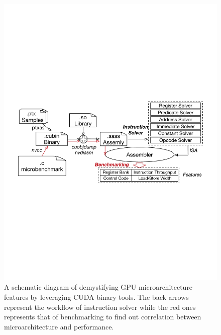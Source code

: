\documentclass{sig-alternate-05-2015}
\begin{document}
\begin{figure}[htbp]
\begin{center}
\includegraphics[scale=0.45]{methodology}
\caption{A schematic diagram of demystifying GPU microarchitecture features by leveraging CUDA binary tools. The back arrows represent the workflow of instruction solver while the red ones represents that of benchmarking to find out correlation between microarchitecture and performance.}
\label{fig:workflow}
\end{center}
\end{figure}
\end{document}
